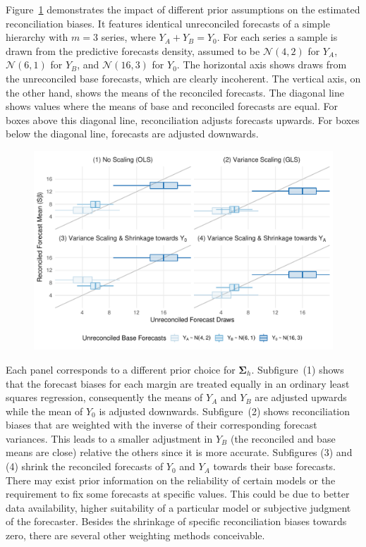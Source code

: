\documentclass[a4paper,fleqn,11pt]{article}
\begin{document}
Figure~\ref{fig:weights} demonstrates the impact of different prior assumptions on the estimated reconciliation biases. It features identical unreconciled forecasts of a simple hierarchy with $m=3$ series, where $Y_A + Y_B = Y_0$. For each series a sample is drawn from the predictive forecasts density, assumed to be $\mathcal{N}(4,2)$ for $Y_A$, $\mathcal{N}(6,1)$ for $Y_B$, and $\mathcal{N}(16,3)$ for $Y_0$. The horizontal axis shows draws from the unreconciled base forecasts, which are clearly incoherent. The vertical axis, on the other hand, shows the means of the reconciled forecasts. The diagonal line shows values where the means of base and reconciled forecasts are equal. For boxes above this diagonal line, reconciliation adjusts forecasts upwards. For boxes below the diagonal line, forecasts are adjusted downwards.
\begin{figure}[H]
	\includegraphics[width=\textwidth]{fig/fig_biases}
	\label{fig:weights}
\end{figure}
Each panel corresponds to a different prior choice for $\boldsymbol{\Sigma}_h$. Subfigure~(1) shows that the forecast biases for each margin are treated equally in an ordinary least squares regression, consequently the means of $Y_A$ and $Y_B$ are adjusted upwards while the mean of $Y_0$ is adjusted downwards. Subfigure~(2) shows reconciliation biases that are weighted with the inverse of their corresponding forecast variances. This leads to a smaller adjustment in $Y_B$ (the reconciled and base means are close) relative the others since it is more accurate. Subfigures (3) and (4) shrink the reconciled forecasts of $Y_0$ and $Y_A$ towards their base forecasts. There may exist prior information on the reliability of certain models or the requirement to fix some forecasts at specific values. This could be due to better data availability, higher suitability of a particular model or subjective judgment of the forecaster. Besides the shrinkage of specific reconciliation biases towards zero, there are several other weighting methods conceivable.
\end{document}
